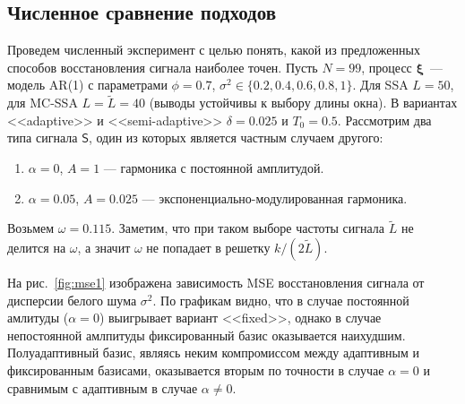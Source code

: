 \documentclass{math-mech-sci}
\begin{document}
\subsection*{Численное сравнение подходов}
Проведем численный эксперимент с целью понять, какой из предложенных способов восстановления сигнала наиболее точен. Пусть $N=99$, процесс $\bm\xi$~--- модель AR(1) с параметрами $\phi=0.7$, $\sigma^2\in\{0.2, 0.4, 0.6, 0.8, 1\}$. Для SSA $L=50$, для MC-SSA $L=\widetilde L=40$ (выводы устойчивы к выбору длины окна). В вариантах <<adaptive>> и <<semi-adaptive>> $\delta=0.025$ и $T_0=0.5$. Рассмотрим два типа сигнала $\mathsf{S}$, один из которых является частным случаем другого:
\begin{enumerate}
    \item $\alpha=0$, $A=1$ --- гармоника с постоянной амплитудой.
    \item $\alpha=0.05$, $A=0.025$ --- экспоненциально-модулированная гармоника.
\end{enumerate}
Возьмем $\omega=0.115$. Заметим, что при таком выборе частоты сигнала $\widetilde L$ не делится на $\omega$, а значит $\omega$ не попадает в решетку $k/(2\widetilde L)$.

На рис.~\ref{fig:mse1} изображена зависимость MSE восстановления сигнала от дисперсии белого шума $\sigma^2$. По графикам видно, что в случае постоянной амлитуды ($\alpha=0$) выигрывает вариант <<fixed>>, однако в случае непостоянной амлпитуды фиксированный базис оказывается наихудшим. Полуадаптивный базис, являясь неким компромиссом между адаптивным и фиксированным базисами, оказывается вторым по точности в случае $\alpha=0$ и сравнимым с адаптивным в случае $\alpha\ne0$.
\end{document}
